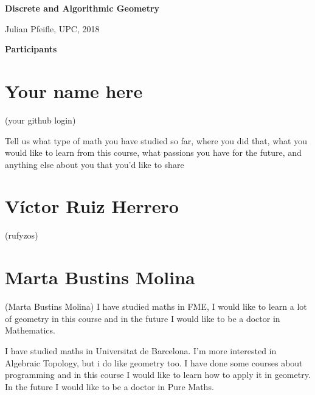 \documentclass[11pt]{amsart}
\begin{document}
\begin{center}
\textbf{\sffamily
   Discrete and Algorithmic Geometry }

\medskip
   Julian Pfeifle,
   UPC, 2018
\end{center}

\bigskip

\begin{center}
  \textbf{\sffamily Participants}
\end{center}

\medskip

\section*{Your name here}
(your github login)

Tell us what type of math you have studied so far, where you did that, what you would like to learn from this course, what passions you have for the future, and anything else about you that you'd like to share

\medskip

\section*{Víctor Ruiz Herrero}
(rufyzos)

\medskip

\section*{Marta Bustins Molina}
 (Marta Bustins Molina)
I  have  studied  maths  in  FME,  I  would  like  to  learn  a  lot  of  geometry  in  this course and in the future I would like to be a doctor in Mathematics.

I have studied maths in Universitat de Barcelona. I'm more interested in Algebraic Topology, but i do like geometry too. I have done some courses about programming and in this course I would like to learn how to apply it in geometry. In the future I would like to be a doctor in Pure Maths.
\end{document}
